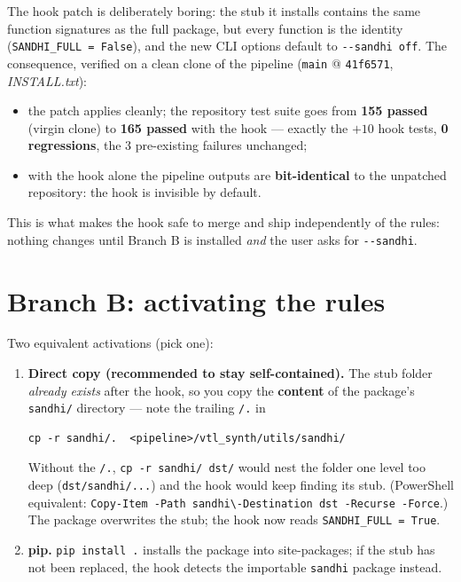 \documentclass[11pt,a4paper]{report}
\newcommand{\smp}[1]{\texttt{#1}}          %
\begin{document}
The hook patch is deliberately boring: the stub it installs contains the same
function signatures as the full package, but every function is the identity
(\smp{SANDHI\_FULL = False}), and the new CLI options default to
\smp{-{}-sandhi off}. The consequence, verified on a clean clone of the
pipeline (\smp{main} @ \smp{41f6571}, \emph{INSTALL.txt}):

\begin{itemize}
  \item the patch applies cleanly; the repository test suite goes from
        \textbf{155 passed} (virgin clone) to \textbf{165 passed} with the
        hook — exactly the $+10$ hook tests, \textbf{0 regressions}, the
        3 pre-existing failures unchanged;
  \item with the hook alone the pipeline outputs are
        \textbf{bit-identical} to the unpatched repository: the hook is
        invisible by default.
\end{itemize}

This is what makes the hook safe to merge and ship independently of the
rules: nothing changes until Branch B is installed \emph{and} the user asks
for \smp{-{}-sandhi}.

\section{Branch B: activating the rules}

Two equivalent activations (pick one):

\begin{enumerate}
  \item \textbf{Direct copy (recommended to stay self-contained).} The stub
        folder \emph{already exists} after the hook, so you copy the
        \textbf{content} of the package's \smp{sandhi/} directory — note the
        trailing \smp{/.} in
\begin{verbatim}
cp -r sandhi/.  <pipeline>/vtl_synth/utils/sandhi/
\end{verbatim}
        Without the \smp{/.}, \smp{cp -r sandhi/ dst/} would nest the folder
        one level too deep (\smp{dst/sandhi/...}) and the hook would keep
        finding its stub. (PowerShell equivalent:
        \smp{Copy-Item -Path sandhi\textbackslash* -Destination dst -Recurse -Force}.) The
        package overwrites the stub; the hook now reads
        \smp{SANDHI\_FULL = True}.
  \item \textbf{pip.} \smp{pip install .} installs the package into
        site-packages; if the stub has not been replaced, the hook detects
        the importable \smp{sandhi} package instead.
\end{enumerate}
\end{document}
